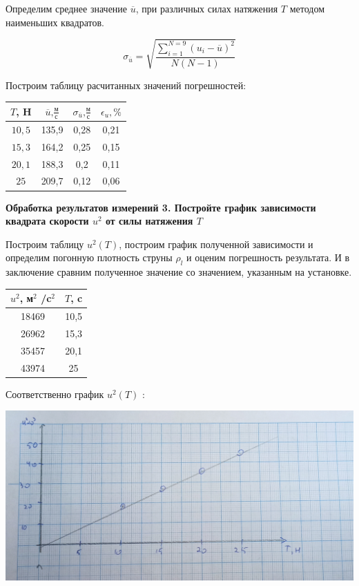 \documentclass[a4paper,12pt]{article} %
\begin{document}
Определим среднее значение $\overline{u}$, при различных силах натяжения $T$ методом наименьших квадратов.

 \[ \sigma_{\overline{u}} = \sqrt{\frac{\sum\limits_{i = 1}^{N = 9}(u_i-\overline{u})^2}{N(N-1)}} \]
 
Построим таблицу расчитанных значений погрешностей:
\begin{center}

\begin{tabular}{|c|c|c|c|}
\hline 
$T$, H & $\overline{u}\textbf{,} \frac{\textbf{м}}{\textbf{с}}$ & $\sigma_{\overline{u}}\textbf{,} \frac{\textbf{м}}{\textbf{с}}$ & $\epsilon_{u}, \% $ \\ 
\hline 
$10,5$ & 135,9 & 0,28 & 0,21 \\ 
\hline 
$15,3$ & 164,2 & 0,25 & 0,15 \\ 
\hline 
$20,1$ & 188,3 & 0,2 & 0,11 \\ 
\hline 
$25$ & 209,7 & 0,12 & 0,06 \\ 
\hline 
\end{tabular}

\end{center} 

{\bf Обработка результатов измерений 3. Постройте график зависимости квадрата скорости $u^2$ от силы натяжения
$T$}

Построим таблицу $u^2(T)$, построим график полученной зависимости и определим погонную плотность струны $\rho_l$ и оценим погрешность результата. И в заключение сравним полученное значение со значением, указанным на установке.

\begin{tabular}{|c|c|}
\hline 
$u^2$, м$^2$ /c$^2$ & $T$, c \\ 
\hline 
18469 & 10,5 \\ 
\hline 
26962 & 15,3 \\ 
\hline 
35457 & 20,1 \\ 
\hline 
43974 & 25 \\ 
\hline 
\end{tabular} 

Соответственно график $u^2(T)$ :

\begin{center}
\includegraphics[scale=0.15]{1.4.5 10}
\end{center}
\end{document}
